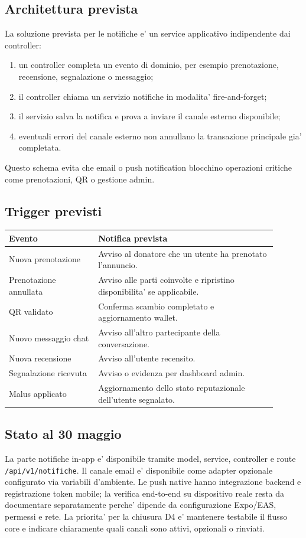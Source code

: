 \documentclass[11pt,a4paper]{article}
\begin{document}
\subsection*{Architettura prevista}

La soluzione prevista per le notifiche e' un service applicativo indipendente dai controller:

\begin{enumerate}
  \item un controller completa un evento di dominio, per esempio prenotazione, recensione, segnalazione o messaggio;
  \item il controller chiama un servizio notifiche in modalita' fire-and-forget;
  \item il servizio salva la notifica e prova a inviare il canale esterno disponibile;
  \item eventuali errori del canale esterno non annullano la transazione principale gia' completata.
\end{enumerate}

Questo schema evita che email o push notification blocchino operazioni critiche come prenotazioni, QR o gestione admin.

\subsection*{Trigger previsti}

\begin{longtable}{p{0.30\linewidth}p{0.60\linewidth}}
\textbf{Evento} & \textbf{Notifica prevista} \\
\hline
Nuova prenotazione & Avviso al donatore che un utente ha prenotato l'annuncio. \\
Prenotazione annullata & Avviso alle parti coinvolte e ripristino disponibilita' se applicabile. \\
QR validato & Conferma scambio completato e aggiornamento wallet. \\
Nuovo messaggio chat & Avviso all'altro partecipante della conversazione. \\
Nuova recensione & Avviso all'utente recensito. \\
Segnalazione ricevuta & Avviso o evidenza per dashboard admin. \\
Malus applicato & Aggiornamento dello stato reputazionale dell'utente segnalato. \\
\end{longtable}

\subsection*{Stato al 30 maggio}

La parte notifiche in-app e' disponibile tramite model, service, controller e route \texttt{/api/v1/notifiche}. Il canale email e' disponibile come adapter opzionale configurato via variabili d'ambiente. Le push native hanno integrazione backend e registrazione token mobile; la verifica end-to-end su dispositivo reale resta da documentare separatamente perche' dipende da configurazione Expo/EAS, permessi e rete. La priorita' per la chiusura D4 e' mantenere testabile il flusso core e indicare chiaramente quali canali sono attivi, opzionali o rinviati.
\end{document}
